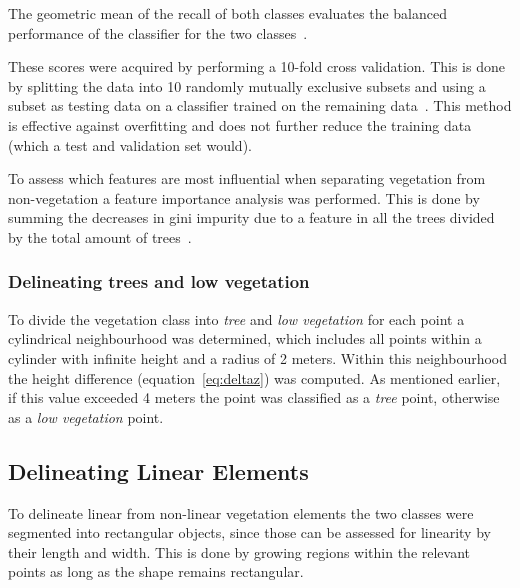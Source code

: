 {The geometric mean of the recall of both classes evaluates the balanced performance of the classifier for the two classes~\citep{kubat1998machine, sun2009classification}.

These scores were acquired by performing a 10-fold cross validation. This is done by splitting the data into 10 randomly mutually exclusive subsets and using a subset as testing data on a classifier trained on the remaining data~\citep{kohavi1995study}. This method is effective against overfitting and does not further reduce the training data (which a test and validation set would).

To assess which features are most influential when separating vegetation from non-vegetation a feature importance analysis was performed. This is done by summing the decreases in gini impurity due to a feature in all the trees divided by the total amount of trees~\citep{breiman2002manual}.

\subsubsection{Delineating trees and low vegetation}
To divide the vegetation class into \textit{tree} and \textit{low vegetation} for each point a cylindrical neighbourhood was determined, which includes all points within a cylinder with infinite height and a radius of 2 meters. Within this neighbourhood the height difference (equation~\ref{eq:deltaz}) was computed. As mentioned earlier, if this value exceeded 4 meters the point was classified as a \textit{tree} point, otherwise as a \textit{low vegetation} point.

\subsection{Delineating Linear Elements}
To delineate linear from non-linear vegetation elements the two classes were segmented into rectangular objects, since those can be assessed for linearity by their length and width. This is done by growing regions within the relevant points as long as the shape remains rectangular. 

}
